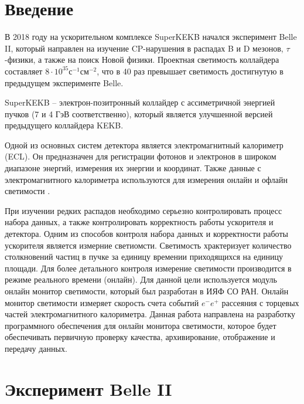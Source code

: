 \documentclass[a4paper, 14pt]{extarticle}
\let\stdsection\section
\renewcommand\section{\newpage\stdsection}
\begin{document}


\setcounter{page}{2}

\tableofcontents
\newpage

\section*{Введение}
  В 2018 году на ускорительном комплексе SuperKEKB начался эксперимент Belle II, который направлен на изучение CP-нарушения в распадах B и D мезонов, $\tau$-физики, а также на поиск Новой физики. Проектная светимость коллайдера составляет $8\cdot10^{35}$с$^{-1}$см$^{-2}$, что в 40 раз превышает светимость достигнутую в предыдущем эксперименте Belle.\par
  SuperKEKB -- электрон-позитронный коллайдер с ассиметричной энергией пучков (7 и 4 ГэВ соответственно), который является улучшенной версией предыдущего коллайдера KEKB.\par
  Одной из основных систем детектора является электромагнитный калориметр (ECL). Он предназначен для регистрации фотонов и электронов в широком диапазоне энергий, измерения их энергии и координат. Также данные с электромагнитного калориметра используются для измерения онлайн и офлайн светимости \cite{TechRep}.\par
  При изучении редких распадов необходимо серьезно контролировать процесс набора данных, а также контролировать корректность работы ускорителя и детектора. Одним из способов контроля набора данных и корректности работы ускорителя является измерние светиомсти. Светимость храктеризует количество столкновений частиц в пучке за единицу времении приходящихся на единицу площади. Для более детального контроля измерение светимости производится в режиме реального времени (онлайн). Для данной цели используется модуль онлайн монитор светимости, который был разработан в ИЯФ СО РАН. Онлайн монитор светимости измеряет скорость счета событий $e^-e^+$ рассеяния с торцевых частей электромагнитного калориметра. Данная работа направлена на разработку программного обеспечения для онлайн монитора светимости, которое будет обеспечивать первичную проверку качества, архивирование, отображение и передачу данных.\par
\section{Эксперимент Belle II}
\end{document}
